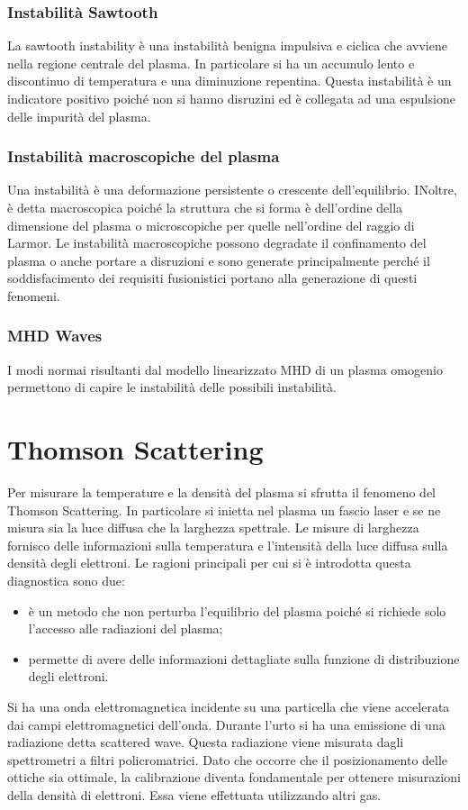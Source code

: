 \documentclass{article}
\begin{document}
\subsubsection{Instabilità Sawtooth}
La sawtooth instability è una instabilità benigna impulsiva e ciclica che avviene nella regione centrale del plasma. In particolare si ha un accumulo lento e discontinuo di temperatura e una diminuzione repentina.\newline
Questa instabilità è un indicatore positivo poiché non si hanno disruzini ed è collegata ad una espulsione delle impurità del plasma.
\subsubsection{Instabilità macroscopiche del plasma}
Una instabilità è una deformazione persistente o crescente dell'equilibrio. INoltre, è detta macroscopica poiché la struttura che si forma è dell'ordine della dimensione del plasma o microscopiche per quelle nell'ordine del raggio di Larmor.\newline
Le instabilità macroscopiche possono degradate il confinamento del plasma o anche portare a disruzioni e sono generate principalmente perché il soddisfacimento dei requisiti fusionistici portano alla generazione di questi fenomeni.
\subsubsection{MHD Waves}
I modi normai risultanti dal modello linearizzato MHD di un plasma omogenio permettono di capire le instabilità delle possibili instabilità.






\section{Thomson Scattering}
Per misurare la temperature e la densità del plasma si sfrutta il fenomeno del Thomson Scattering. In particolare si inietta nel plasma un fascio laser e se ne misura sia la luce diffusa che la larghezza spettrale.\newline
Le misure di larghezza fornisco delle informazioni sulla temperatura e l'intensità della luce diffusa sulla densità degli elettroni. Le ragioni principali per cui si è introdotta questa diagnostica sono due:\begin{itemize}
    \item è un metodo che non perturba l'equilibrio del plasma poiché si richiede solo l'accesso alle radiazioni del plasma;
    \item permette di avere delle informazioni dettagliate sulla funzione di distribuzione degli elettroni.
\end{itemize}
Si ha una onda elettromagnetica incidente su una particella che viene accelerata dai campi elettromagnetici dell'onda. Durante l'urto si ha una emissione di una radiazione detta scattered wave. Questa radiazione viene misurata dagli spettrometri a filtri policromatrici.
Dato che occorre che il posizionamento delle ottiche sia ottimale, la calibrazione diventa fondamentale per ottenere misurazioni della densità di elettroni. Essa viene effettuata utilizzando altri gas.
\end{document}
